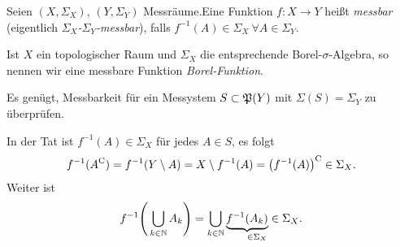 \documentclass[skript.tex]{subfiles}
\begin{document}
		\begin{defin}
			Seien $(X,\Sigma_X)$, $(Y,\Sigma_Y)$ Messräume.Eine Funktion $f \colon X \to Y$ heißt \textit{messbar} (eigentlich \textit{$\Sigma_X$-$\Sigma_Y$-messbar}), falls $f^{-1}(A) \in \Sigma_X\: \forall A \in \Sigma_Y$.
				
			Ist $X$ ein topologischer Raum und $\Sigma_X$ die entsprechende
			Borel-$\sigma$-Algebra, so nennen wir eine messbare Funktion
			\textit{Borel-Funktion}.
		\end{defin}
		
		\begin{bem}
			Es genügt, Messbarkeit für ein Messystem $S \subset \mathfrak{P}(Y)$ mit $\Sigma(S) = \Sigma_Y$
			zu überprüfen.
			
			In der Tat ist $f^{-1}(A) \in \Sigma_X$ für jedes $A \in S$, es folgt
			\[
				f^{-1}(A^\mathrm{C}) = f^{-1}(Y \setminus A) = X \setminus f^{-1}(A) 
				= \big(f^{-1}(A)\big)^\mathrm{C} \in \Sigma_X.
			\]
			Weiter ist
			\[
				f^{-1}{\Bigg( \bigcup_{k\in\N} A_k \Bigg) 
				= \bigcup_{k\in\N} \underbrace{f^{-1}(A_k)}_{\mathrlap{\in \Sigma_X}}
				\in \Sigma_X}.
			\]
		\end{bem}
	
		\setcounter{footnote}{11}


		
\end{document}
